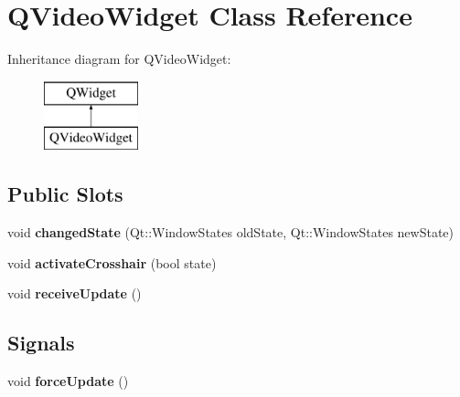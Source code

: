 \hypertarget{class_q_video_widget}{\section{Q\-Video\-Widget Class Reference}
\label{class_q_video_widget}
}
Inheritance diagram for Q\-Video\-Widget\-:\begin{figure}[H]
\begin{center}
\leavevmode
\includegraphics[height=2.000000cm]{class_q_video_widget}
\end{center}
\end{figure}
\subsection*{Public Slots}
\begin{DoxyCompactItemize}
\item 
\hypertarget{class_q_video_widget_aa3be10b5a18667fe60b6da0deba33e2b}{void {\bfseries changed\-State} (Qt\-::\-Window\-States old\-State, Qt\-::\-Window\-States new\-State)}\label{class_q_video_widget_aa3be10b5a18667fe60b6da0deba33e2b}

\item 
\hypertarget{class_q_video_widget_a35f34cdbb0f92307698c02b2dc99c4bd}{void {\bfseries activate\-Crosshair} (bool state)}\label{class_q_video_widget_a35f34cdbb0f92307698c02b2dc99c4bd}

\item 
\hypertarget{class_q_video_widget_a12b2bc7e23dd56adff244520acf4d16c}{void {\bfseries receive\-Update} ()}\label{class_q_video_widget_a12b2bc7e23dd56adff244520acf4d16c}

\end{DoxyCompactItemize}
\subsection*{Signals}
\begin{DoxyCompactItemize}
\item 
\hypertarget{class_q_video_widget_a7669505f07e3d66ea9a0c1553c096ea2}{void {\bfseries force\-Update} ()}\label{class_q_video_widget_a7669505f07e3d66ea9a0c1553c096ea2}

\end{DoxyCompactItemize}
